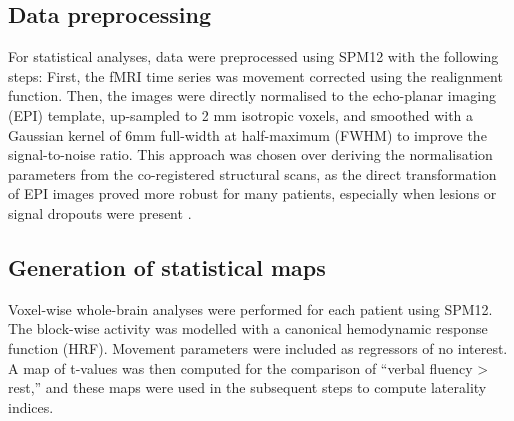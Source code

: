 \documentclass[fleqn,10pt]{SelfArx} %
\begin{document}
\subsection{Data preprocessing}
For statistical analyses, data were preprocessed using SPM12 with the following steps: First, the fMRI time series was movement corrected using the realignment function. Then, the images were directly normalised to the echo-planar imaging (EPI) template, up-sampled to 2 mm isotropic voxels, and smoothed with a Gaussian kernel of 6mm full-width at half-maximum (FWHM) to improve the signal-to-noise ratio. This approach was chosen over deriving the normalisation parameters from the co-registered structural scans, as the direct transformation of EPI images proved more robust for many patients, especially when lesions or signal dropouts were present \citep{Calhoun_2017}.

\subsection{Generation of statistical maps}
Voxel-wise whole-brain analyses were performed for each patient using SPM12. The block-wise activity was modelled with a canonical hemodynamic response function (HRF). Movement parameters were included as regressors of no interest. A map of t-values was then computed for the comparison of “verbal fluency > rest,” and these maps were used in the subsequent steps to compute laterality indices.
\end{document}
